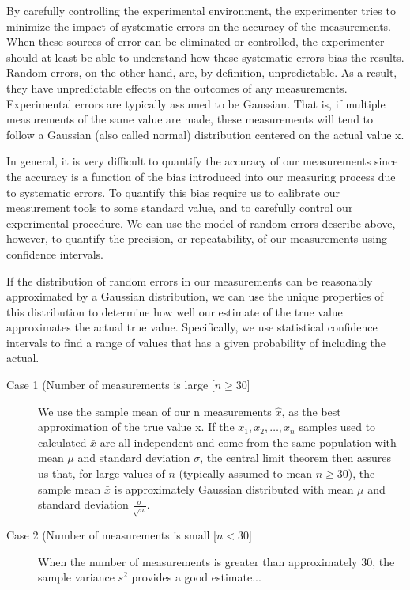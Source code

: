 \documentclass[openany, a4paper]{book}
\theoremstyle{plain}
\theoremstyle{definition}
\theoremstyle{remark}
\begin{document}
By carefully controlling the experimental environment, the experimenter
tries to minimize the impact of systematic errors on the accuracy of the
measurements. When these sources of error can be eliminated or controlled,
the experimenter should at least be able to understand how these systematic
errors bias the results. Random errors, on the other hand, are, by
definition, unpredictable. As a result, they have unpredictable effects on
the outcomes of any measurements. Experimental errors are typically assumed
to be Gaussian. That is, if multiple measurements of the same value are
made, these measurements will tend to follow a Gaussian (also called normal)
distribution centered on the actual value x.

In general, it is very difficult to quantify the accuracy of our
measurements since the accuracy is a function of the bias introduced into
our measuring process due to systematic errors. To quantify this bias
require us to calibrate our measurement tools to some standard value, and to
carefully control our experimental procedure. We can use the model of
random errors describe above, however, to quantify the precision, or
repeatability, of our measurements using confidence intervals.

If the distribution of random errors in our measurements can be reasonably
approximated by a Gaussian distribution, we can use the unique properties of
this distribution to determine how well our estimate of the true value
approximates the actual true value. Specifically, we use statistical
confidence intervals to find a range of values that has a given probability
of including the actual.

\begin{description}
\item[{Case 1 (Number of measurements is large [\(n \ge 30\)]}] We use the
sample mean of our n measurements \(\hat{x}\), as the best approximation
of the true value x. If the \(x_1, x_2, \ldots, x_n\) samples used to
calculated \(\bar{x}\) are all independent and come from the same
population with mean \(\mu\) and standard deviation \(\sigma\), the
central limit theorem then assures us that, for large values of \(n\)
(typically assumed to mean \(n \ge 30\)), the sample mean \(\bar{x}\) is
approximately Gaussian distributed with mean \(\mu\) and standard
deviation \(\frac{\sigma}{\sqrt{n}}\).

\item[{Case 2 (Number of measurements is small [\(n < 30\)]}] When the number of
measurements is greater than approximately 30, the sample variance \(s^2\)
provides a good estimate...
\end{description}
\end{document}
